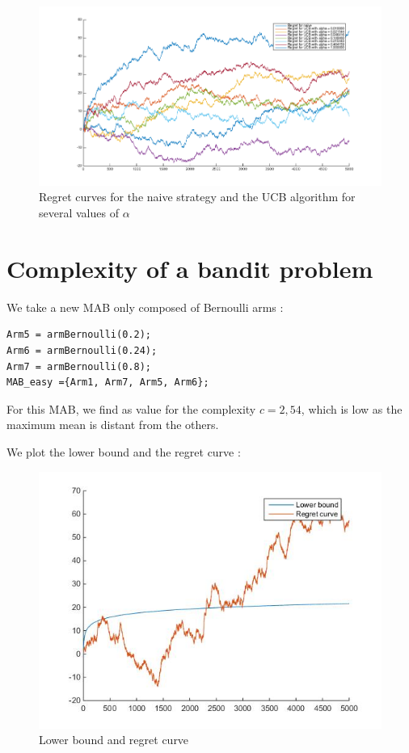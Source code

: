 \documentclass[11pt,a4paper]{article}
\begin{document}
\hspace*{-90mm}\begin{figure}[H]
	\hspace*{-15mm}\noindent\includegraphics[scale=0.6]{regret_curves.png}
	\caption{Regret curves for the naive strategy and the UCB algorithm for several values of $\alpha$}
\end{figure}

\section{Complexity of a bandit problem}

We take a new MAB only composed of Bernoulli arms :
\begin{verbatim}
Arm5 = armBernoulli(0.2);
Arm6 = armBernoulli(0.24);
Arm7 = armBernoulli(0.8);
MAB_easy ={Arm1, Arm7, Arm5, Arm6};
\end{verbatim}

For this MAB, we find as value for the complexity $c = 2,54$, which is low as the maximum mean is distant from the others.

We plot the lower bound and the regret curve :
\begin{figure}[H]
	\centering
	\noindent\includegraphics[scale=0.4]{complexity.jpg}
	\caption{Lower bound and regret curve}
\end{figure}
\end{document}

